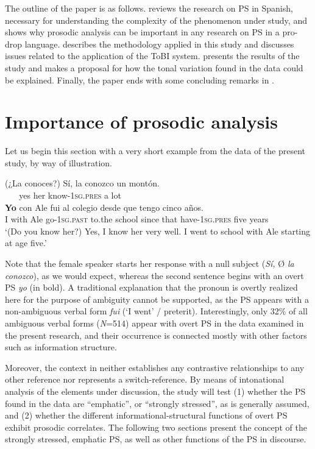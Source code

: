 \documentclass[output=paper]{langsci/langscibook}
\begin{document}
The outline of the paper is as follows.  reviews the research on PS in Spanish, necessary for understanding the complexity of the phenomenon under study, and shows why prosodic analysis can be important in any research on PS in a pro-drop language.  describes the methodology applied in this study and discusses issues related to the application of the ToBI system.  presents the results of the study and makes a proposal for how the tonal variation found in the data could be explained. Finally, the paper ends with some concluding remarks in . 

\section{Importance of prosodic analysis}
\label{sec:pes:2}
Let us begin this section with a very short example  from the data of the present study, by way of illustration.


\ea \label{ex:pes:1}
\gll  (¿La conoces?)   Sí,  la  conozco     un montón.\\
      ~ ~     yes  her   know-\textsc{1sg}.\textsc{pres}  a lot\\
     
\gll \textbf{Yo} con Ale   fui     al colegio  desde que tengo     cinco a{\~n}os. \\
     I with Ale    go-\textsc{1sg}.\textsc{past}   to.the school  since that have-\textsc{1sg}.\textsc{pres} five years\\
\glt ‘(Do you know her?) Yes, I know her very well. I went to school with Ale starting at age five.’
\z

Note that the female speaker starts her response with a null subject (\textit{Sí,} Ø \textit{la conozco}), as we would expect, whereas the second sentence begins with an overt PS \textit{yo} (in bold). A traditional explanation that the pronoun is overtly realized here for the purpose of ambiguity cannot be supported, as the PS appears with a non-ambiguous verbal form \textit{fui} (‘I went’ / preterit). Interestingly, only 32\% of all ambiguous verbal forms (\textit{N}=514) appear with overt PS in the data examined in the present research, and their occurrence is connected mostly with other factors such as information structure.

Moreover, the context in  neither establishes any contrastive relationships to any other reference nor represents a switch-reference. By means of intonational analysis of the elements under discussion, the study will test 
(1) whether the PS found in the data are ``emphatic'', or ``strongly stressed'', as is generally assumed, and
(2) whether the different informational-structural functions of overt PS exhibit prosodic correlates. The following two sections present the concept of the strongly stressed, emphatic PS, as well as other functions of the PS in discourse.
  
\end{document}
